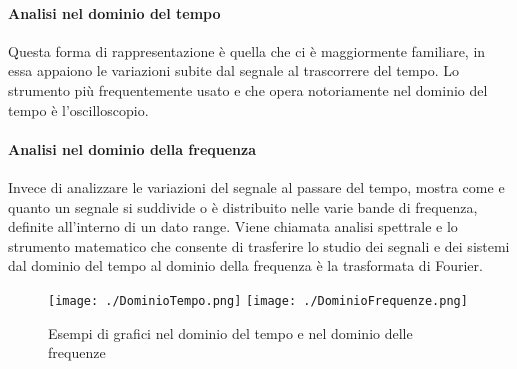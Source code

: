 \paragraph{Analisi nel dominio del tempo}
Questa forma di rappresentazione \`e quella che ci \`e maggiormente familiare, in essa appaiono le variazioni subite dal segnale al trascorrere del tempo. 
Lo strumento pi\`u frequentemente usato e che opera notoriamente nel dominio del tempo \`e l'oscilloscopio.

\paragraph{Analisi nel dominio della frequenza}

Invece di analizzare le variazioni del segnale al passare del tempo, mostra come e quanto un segnale si suddivide o \`e distribuito nelle varie bande di frequenza, definite all'interno di un dato range. 
Viene chiamata analisi spettrale e lo strumento matematico che consente di trasferire lo studio dei segnali e dei sistemi dal dominio del tempo al dominio della frequenza \`e la trasformata di Fourier.

%
\begin{figure}[htbp]
\centering
\texttt{[image: ./DominioTempo.png]}%
\qquad\qquad
\texttt{[image: ./DominioFrequenze.png]}
\caption{Esempi di grafici nel dominio del tempo e nel dominio delle frequenze \cite{IDOMTF}}
\end{figure}